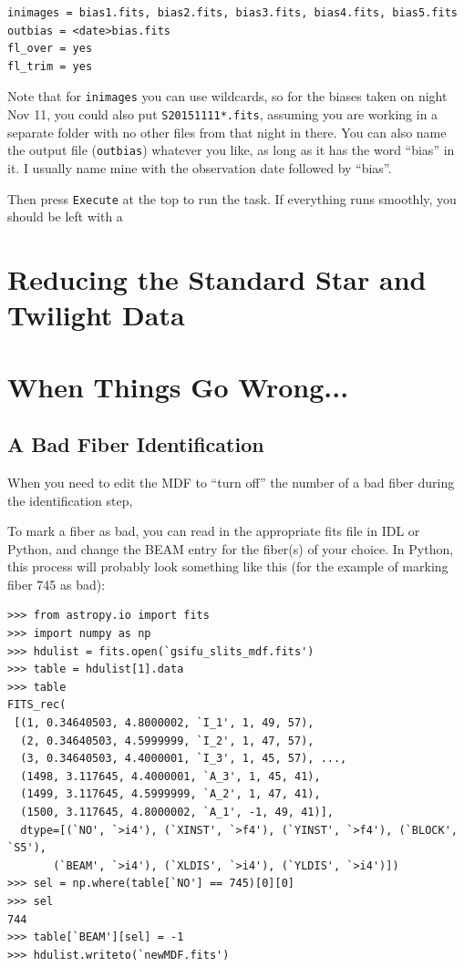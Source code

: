 \documentclass[12pt]{report}
\begin{document}
\begin{verbatim}
inimages = bias1.fits, bias2.fits, bias3.fits, bias4.fits, bias5.fits
outbias = <date>bias.fits
fl_over = yes
fl_trim = yes 
\end{verbatim}

\noindent Note that for \texttt{inimages} you can use wildcards, so for the biases taken on night Nov 11, you could also put \texttt{S20151111*.fits}, assuming you are working in a separate folder with no other files from that night in there. You can also name the output file (\texttt{outbias}) whatever you like, as long as it has the word ``bias'' in it. I usually name mine with the observation date followed by ``bias''.

Then press \texttt{Execute} at the top to run the task. If everything runs smoothly, you should be left with a 

\bigskip
\section{Reducing the Standard Star and Twilight Data}
\label{standard}

\bigskip
\section{When Things Go Wrong...}

\bigskip
\subsection{A Bad Fiber Identification}

\label{badfiber}
When you need to edit the MDF to ``turn off'' the number of a bad fiber during the identification step, 

To mark a fiber as bad, you can read in the appropriate fits file in IDL or Python, and change the BEAM entry for the fiber(s) of your choice. In Python, this process will probably look something like this (for the example of marking fiber 745 as bad):

\begin{verbatim}
>>> from astropy.io import fits
>>> import numpy as np
>>> hdulist = fits.open(`gsifu_slits_mdf.fits')
>>> table = hdulist[1].data
>>> table
FITS_rec(
 [(1, 0.34640503, 4.8000002, `I_1', 1, 49, 57),
  (2, 0.34640503, 4.5999999, `I_2', 1, 47, 57),
  (3, 0.34640503, 4.4000001, `I_3', 1, 45, 57), ...,
  (1498, 3.117645, 4.4000001, `A_3', 1, 45, 41),
  (1499, 3.117645, 4.5999999, `A_2', 1, 47, 41),
  (1500, 3.117645, 4.8000002, `A_1', -1, 49, 41)], 
  dtype=[(`NO', `>i4'), (`XINST', `>f4'), (`YINST', `>f4'), (`BLOCK', `S5'),
  	   (`BEAM', `>i4'), (`XLDIS', `>i4'), (`YLDIS', `>i4')])
>>> sel = np.where(table[`NO'] == 745)[0][0]
>>> sel
744
>>> table[`BEAM'][sel] = -1
>>> hdulist.writeto(`newMDF.fits')
\end{verbatim}
\end{document}
